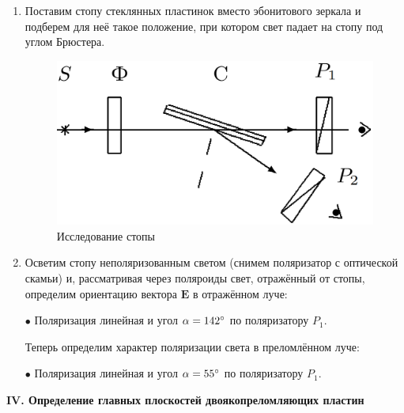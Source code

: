 \documentclass[12pt,a4paper]{article}
\begin{document}
	\begin{enumerate}
		\item Поставим стопу стеклянных пластинок вместо эбонитового зеркала и подберем для неё такое положение, при котором свет падает на стопу под углом Брюстера.
		
		\begin{figure}[h!]
			\centering
			\includegraphics[scale=0.31]{res/III}
			\caption{Исследование стопы}
		\end{figure}

		\item Осветим стопу неполяризованным светом (снимем поляризатор с оптической скамьи) и, рассматривая через поляроиды свет, отражённый от стопы, определим ориентацию вектора $\boldsymbol{E}$ в отражённом луче:
		
		$\bullet$ Поляризация линейная и угол $\alpha = 142\degree$ по поляризатору $P_1$.
		
		Теперь определим характер поляризации света в преломлённом луче:
		
		$\bullet$ Поляризация линейная и угол $\alpha = 55\degree$ по поляризатору $P_1$.
	\end{enumerate}

	\begin{center}
		\textbf{IV. Определение главных плоскостей двоякопреломляющих пластин}
	\end{center}
\end{document}
